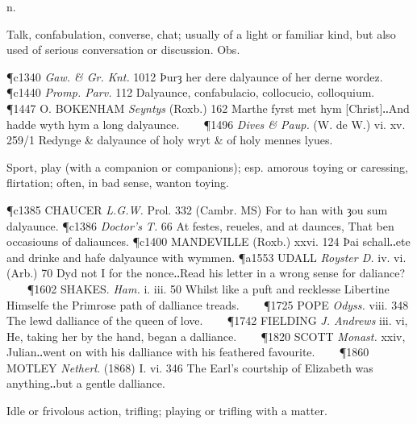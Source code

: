 \begin{description}[wide, labelwidth=!, labelindent=0pt] %


 n.

\noindent {}


\vspace{-0.3cm}

\begin{myenumerate}

 Talk, confabulation, converse, chat; usually of a light or familiar kind, but also used of serious conversation or discussion. Obs.

\P c1340 \textit{Gaw. \& Gr.  Knt.} 1012 Þurȝ her dere dalyaunce of her derne wordez.
\P c1440  \textit{Promp. Parv.} 112 Dalyaunce, confabulacio, collocucio, colloquium.    
\P 1447 O. BOKENHAM  \textit{Seyntys} (Roxb.) 162 Marthe fyrst met hym [Christ]‥And hadde wyth hym a long dalyaunce.    
\P 1496 \textit{Dives \& Paup.} (W. de W.) vi. xv. 259/1 Redynge \& dalyaunce of holy wryt \& of holy mennes lyues.

 Sport, play (with a companion or companions); esp. amorous toying or caressing, flirtation; often, in bad sense, wanton toying.

\P c1385 CHAUCER  \textit{L.G.W.} Prol. 332 (Cambr. MS) For to han with ȝou sum dalyaunce.
\P c1386 \textit{Doctor's T.} 66 At festes, reueles, and at daunces, That ben occasiouns of daliaunces.
\P c1400 MANDEVILLE  (Roxb.) xxvi. 124 Þai schall‥ete and drinke and hafe dalyaunce with wymmen.
\P a1553 UDALL  \textit{Royster D.} iv. vi. (Arb.) 70 Dyd not I for the nonce‥Read his letter in a wrong sense for daliance?    
\P 1602 SHAKES.  \textit{Ham.} i. iii. 50 Whilst like a puft and recklesse Libertine Himselfe the Primrose path of dalliance treads.    
\P 1725 POPE  \textit{Odyss.} viii. 348 The lewd dalliance of the queen of love.    
\P 1742 FIELDING  \textit{J. Andrews} iii. vi, He, taking her by the hand, began a dalliance.    
\P 1820 SCOTT  \textit{Monast.} xxiv, Julian‥went on with his dalliance with his feathered favourite.    
\P 1860 MOTLEY  \textit{Netherl.} (1868) I. vi. 346 The Earl's courtship of Elizabeth was anything‥but a gentle dalliance.

 Idle or frivolous action, trifling; playing or trifling with a matter.


\end{myenumerate}
\end{description}

